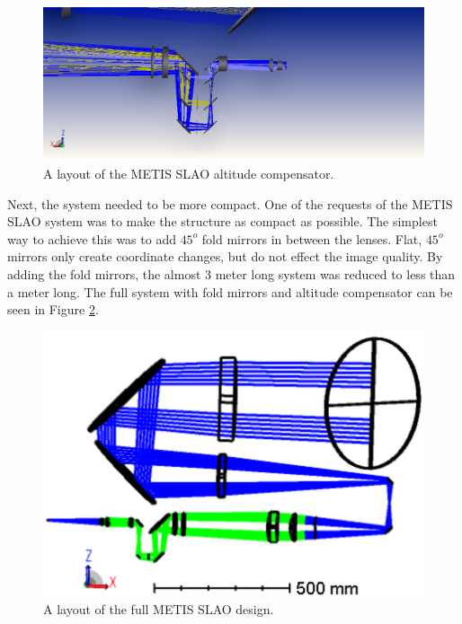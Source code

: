 \begin{figure}[h!]
\centering
\includegraphics[width=14cm]{Figures/shaded_zoom.png}
\caption{A layout of the METIS SLAO altitude compensator.}
\label{fig:SLAO_comp}
\end{figure}

Next, the system needed to be more compact.  One of the requests of the METIS SLAO
system was to make the structure as compact as possible.  The simplest way to
achieve this was to add $45^{o}$ fold mirrors in between the lenses.  Flat, $45^{o}$
mirrors only create coordinate changes, but do not effect the image quality.  By
adding the fold mirrors, the almost 3 meter long system was reduced to less than a
meter long.  The full system with fold mirrors and altitude compensator can be seen
in Figure \ref{fig:SLAO_trace}.

\begin{figure}[h!]
\centering
\includegraphics[width=14cm]{Figures/system_trace.png}
\caption{A layout of the full METIS SLAO design.}
\label{fig:SLAO_trace}
\end{figure}

